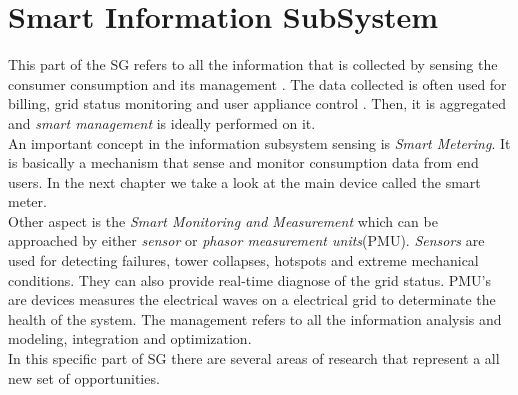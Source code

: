\section{Smart Information SubSystem}
This part of the SG refers to all the information that is collected by sensing the consumer consumption and its management . The data collected is often used for billing, grid status monitoring and user appliance control \cite{journals/comsur/FangMXY12}. Then, it is aggregated and \textit{smart management} is ideally performed on it.\\
An important concept in the information subsystem sensing is \textit{Smart Metering}. It is basically a mechanism that sense and monitor consumption data from end users. In the next chapter we take a look at the main device called the smart meter.\\
Other aspect is the \textit{Smart Monitoring and Measurement} which can be approached by either \textit{sensor} or \textit{phasor measurement units}(PMU). \textit{Sensors} are used for detecting failures, tower collapses, hotspots and extreme mechanical conditions. They can also provide real-time diagnose of the grid status. PMU's are devices measures the electrical waves on a electrical grid to determinate the health   of the system.
The management refers to all the information analysis and modeling, integration and optimization.\\
In this specific part of SG there are several areas of research that represent a all new set of opportunities.


